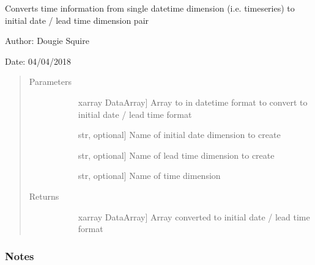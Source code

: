 \documentclass[letterpaper,10pt,english]{sphinxmanual}
\begin{document}
\begin{fulllineitems}
\label{\detokenize{utils_doc:utils.datetime_to_leadtime}}
Converts time information from single datetime dimension (i.e. timeseries) to initial date /                lead time dimension pair

\begin{DUlineblock}{0em}
\item[] Author: Dougie Squire
\item[] Date: 04/04/2018
\end{DUlineblock}
\begin{quote}\begin{description}
\item[{Parameters}] \leavevmode\begin{description}
\item[{}] \leavevmode{[}xarray DataArray{]}
Array to in datetime format to convert to initial date / lead time format

\item[{}] \leavevmode{[}str, optional{]}
Name of initial date dimension to create

\item[{}] \leavevmode{[}str, optional{]}
Name of lead time dimension to create

\item[{}] \leavevmode{[}str, optional{]}
Name of time dimension

\end{description}

\item[{Returns}] \leavevmode\begin{description}
\item[{}] \leavevmode{[}xarray DataArray{]}
Array converted to initial date / lead time format

\end{description}

\end{description}\end{quote}
\subsubsection*{Notes}


\end{fulllineitems}
\end{document}
